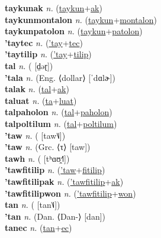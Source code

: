 \textbf{taykunak} \textit{n.} (\hyperref[taykun]{taykun}+\hyperref[ak]{ak})
 \label{taykunak} \\
\textbf{taykunmontalon} \textit{n.} (\hyperref[taykun]{taykun}+\hyperref[montalon]{montalon})
 \label{taykunmontalon} \\
\textbf{taykunpatolon} \textit{n.} (\hyperref[taykun]{taykun}+\hyperref[patolon]{patolon})
 \label{taykunpatolon} \\
\textbf{'taytec} \textit{n.} (\hyperref['tay]{'tay}+\hyperref[tec]{tec})
 \label{'taytec} \\
\textbf{'taytilip} \textit{n.} (\hyperref['tay]{'tay}+\hyperref[tilip]{tilip})
 \label{'taytilip} \\
\textbf{tal} \textit{n.} ( [d̤əɽ])
 \label{tal} \\
\textbf{'tala} \textit{n.} (Eng. ⟨dollar⟩ [ˈdɑlɚ])
 \label{'tala} \\
\textbf{talak} \textit{n.} (\hyperref[tal]{tal}+\hyperref[ak]{ak})
 \label{talak} \\
\textbf{taluat} \textit{n.} (\hyperref[ta]{ta}+\hyperref[luat]{luat})
 \label{taluat} \\
\textbf{talpaholon} \textit{n.} (\hyperref[tal]{tal}+\hyperref[paholon]{paholon})
 \label{talpaholon} \\
\textbf{talpoltilum} \textit{n.} (\hyperref[tal]{tal}+\hyperref[poltilum]{poltilum})
 \label{talpoltilum} \\
\textbf{'taw} \textit{n.} ( [taw˥˩])
 \label{'taw} \\
\textbf{'taw} \textit{n.} (Grc. ⟨τ⟩ [taw])
 \label{'taw} \\
\textbf{tawh} \textit{n.} ( [tʰɑʊ̯˧˥])
 \label{tawh} \\
\textbf{'tawfitilip} \textit{n.} (\hyperref['taw]{'taw}+\hyperref[fitilip]{fitilip})
 \label{'tawfitilip} \\
\textbf{'tawfitilipak} \textit{n.} (\hyperref['tawfitilip]{'tawfitilip}+\hyperref[ak]{ak})
 \label{'tawfitilipak} \\
\textbf{'tawfitilipwon} \textit{n.} (\hyperref['tawfitilip]{'tawfitilip}+\hyperref[won]{won})
 \label{'tawfitilipwon} \\
\textbf{tan} \textit{n.} ( [tan˥˩])
 \label{tan} \\
\textbf{'tan} \textit{n.} (Dan. ⟨Dan-⟩ [dan])
 \label{'tan} \\
\textbf{tanec} \textit{n.} (\hyperref[tan]{tan}+\hyperref[ec]{ec})
 \label{tanec} \\
